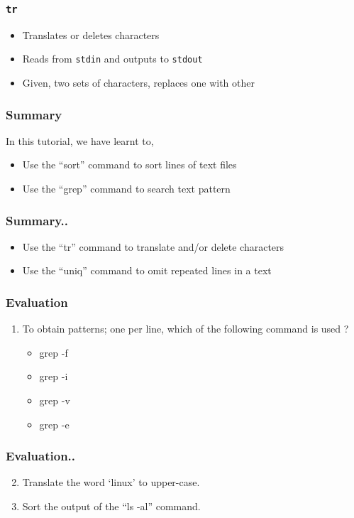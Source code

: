 \documentclass[17pt,compress]{beamer}
\begin{document}
\begin{frame}[fragile]
  \frametitle{\texttt{tr}}
  \begin{itemize}
  \item Translates or deletes characters
  \item Reads from \texttt{stdin} and outputs to \texttt{stdout}
  \item Given, two sets of characters, replaces one with other
  \end{itemize}
\end{frame}

\begin{frame}
\frametitle{Summary}
\label{sec-8}

  In this tutorial, we have learnt to,


\begin{itemize}
\item Use the ``sort'' command to sort lines of text files
\item Use the ``grep'' command to search text pattern
\end{itemize}
\end{frame}

\begin{frame}
\frametitle{Summary..}
\begin{itemize}
\item Use the ``tr'' command to translate and/or delete characters
\item Use the ``uniq'' command to omit repeated lines in a text
\end{itemize}
\end{frame}

\begin{frame}[fragile]
\frametitle{Evaluation}
\label{sec-9}


\begin{enumerate}
\item To obtain patterns; one per line, which of the following command is used ?
\vspace{3pt}
\begin{itemize}
\item grep -f
\item grep -i
\item grep -v
\item grep -e
\end{itemize}
\end{enumerate}
\end{frame}

\begin{frame}[fragile]
\frametitle{Evaluation..}
\begin{enumerate}
\setcounter{enumi}{1}
\item Translate the word `linux' to upper-case.
\vspace{8pt}
\item Sort the output of the ``ls -al'' command.
\end{enumerate}
\end{frame}
\end{document}
